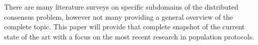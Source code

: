 There are many literature surveys on specific subdomains of the distributed consensus problem, however not many providing a general overview of the complete topic. This paper will provide that complete snapshot of the current state of the art with a focus on the most recent research in population protocols. 
\clearpage
